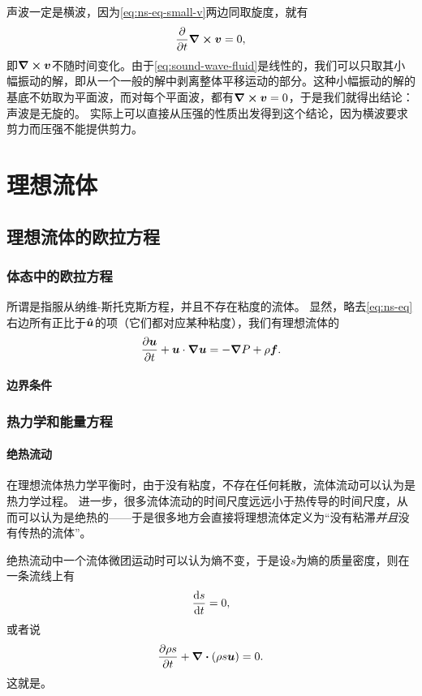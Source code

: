 声波一定是横波，因为\eqref{eq:ns-eq-small-v}两边同取旋度，就有
\[
    \pdv{t} \curl{\vb*{v}} = 0, 
\]
即$\curl{\vb*{v}}$不随时间变化。由于\eqref{eq:sound-wave-fluid}是线性的，我们可以只取其小幅振动的解，即从一个一般的解中剥离整体平移运动的部分。这种小幅振动的解的基底不妨取为平面波，而对每个平面波，都有$\curl{\vb*{v}}=0$，于是我们就得出结论：声波是无旋的。
实际上可以直接从压强的性质出发得到这个结论，因为横波要求剪力而压强不能提供剪力。

\chapter{理想流体}

\section{理想流体的欧拉方程}

\subsection{体态中的欧拉方程}

所谓是指服从纳维-斯托克斯方程，并且不存在粘度的流体。
显然，略去\eqref{eq:ns-eq}右边所有正比于$\vu*{u}$的项（它们都对应某种粘度），我们有理想流体的
\begin{equation}
    \pdv{\vb*{u}}{t} + \vb*{u} \cdot \grad \vb*{u} = - \grad P + \rho \vb*{f}.
\end{equation}

\subsubsection{边界条件}

\subsection{热力学和能量方程}

\subsubsection{绝热流动}

在理想流体热力学平衡时，由于没有粘度，不存在任何耗散，流体流动可以认为是热力学过程。
进一步，很多流体流动的时间尺度远远小于热传导的时间尺度，从而可以认为是绝热的——于是很多地方会直接将理想流体定义为“没有粘滞\emph{并且}没有传热的流体”。

绝热流动中一个流体微团运动时可以认为熵不变，于是设$s$为熵的质量密度，则在一条流线上有
\begin{equation}
    \dv{s}{t} = 0,
\end{equation}
或者说
\begin{equation}
    \pdv{\rho s}{t} + \div{(\rho s \vb*{u})} = 0.
\end{equation}
这就是。

